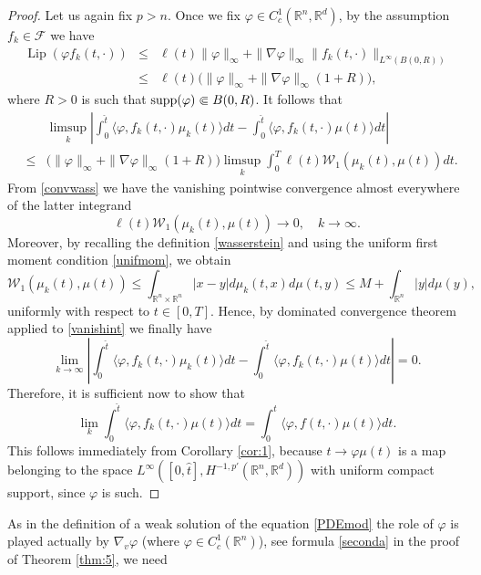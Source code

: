 \documentclass[11pt]{article}
\theoremstyle{plain}
\theoremstyle{definition}
\theoremstyle{remark}
\numberwithin{equation}{section}
\newcommand{\supp}{{\rm supp}}
\begin{document}
\begin{proof}
Let us again fix $p>n$. Once we fix $\varphi \in C_c^1(\mathbb R^n, \mathbb R^d)$,  by the assumption $f_k \in \mathcal F$ we have
\begin{eqnarray*}
\operatorname{Lip}(\varphi f_k(t,\cdot)) &\leq& \ell(t) \|\varphi\|_\infty+ \|\nabla \varphi\|_\infty \| f_k(t,\cdot) \|_{L^\infty(B(0,R))} \nonumber \\
&\leq& \ell(t) \Big (\|\varphi\|_\infty+ \|\nabla \varphi\|_\infty (1+R) \Big),
\end{eqnarray*}
where $R>0$ is such that $\supp(\varphi) \Subset B(0,R)$. It follows that
\begin{eqnarray}
&& \limsup_k \left | \int_0^{\hat t} \langle \varphi, f_k(t,\cdot) \mu_k(t) \rangle dt- \int_0^{\hat t} \langle \varphi, f_k(t,\cdot) \mu(t) \rangle dt \right | \nonumber \\
&\leq& \Big (\|\varphi\|_\infty+ \|\nabla \varphi\|_\infty (1+R) \label{equiLip} \Big) \limsup_k  \int_0^T  \ell(t) \mathcal W_1(\mu_k(t),\mu(t)) dt. \label{vanishint}
\end{eqnarray}
From \eqref{convwass} we have the vanishing pointwise convergence almost everywhere of the latter integrand 
$$\ell(t)  \mathcal W_1(\mu_k(t),\mu(t)) \to 0, \quad k \to \infty.$$ 
Moreover, by recalling the definition \eqref{wasserstein} and using the uniform first moment condition \eqref{unifmom}, we obtain
\begin{equation}\label{boundw1}
\mathcal W_1(\mu_k(t),\mu(t)) \leq \int_{\mathbb  R^n \times \mathbb R^n} |x-y| d\mu_k(t,x) d\mu(t,y) \leq M + \int_{\mathbb R^n} |y|d\mu(y),
\end{equation}
uniformly with respect to $t \in [0,T]$. Hence, by dominated convergence theorem applied to \eqref{vanishint} we finally have 
$$
\lim_{k \to \infty} \left | \int_0^{\hat t} \langle \varphi, f_k(t,\cdot) \mu_k(t) \rangle dt- \int_0^{\hat t} \langle \varphi, f_k(t,\cdot) \mu(t) \rangle dt \right | =0.
$$
Therefore, it is sufficient now to show that
$$
\lim_k  \int_0^{\hat t} \langle \varphi, f_k(t,\cdot) \mu(t) \rangle dt =\int_0^{\hat t} \langle \varphi, f(t,\cdot) \mu(t) \rangle dt.
$$
This follows immediately from Corollary \ref{cor:1}, because $t \to \varphi \mu(t) $ is a map belonging to the space $L^\infty([0,\hat t], H^{-1,p'}(\mathbb R^n, \mathbb R^d))$ with 
uniform compact support, since $\varphi$ is such.
\end{proof}
As in the definition of a weak solution of the equation \eqref{PDEmod} the role of $\varphi$ is played actually by $\nabla_v \varphi$ (where $\varphi \in C_c^1(\mathbb R^n)$), see formula \eqref{seconda} in the proof of Theorem \ref{thm:5}, we need
\end{document}
